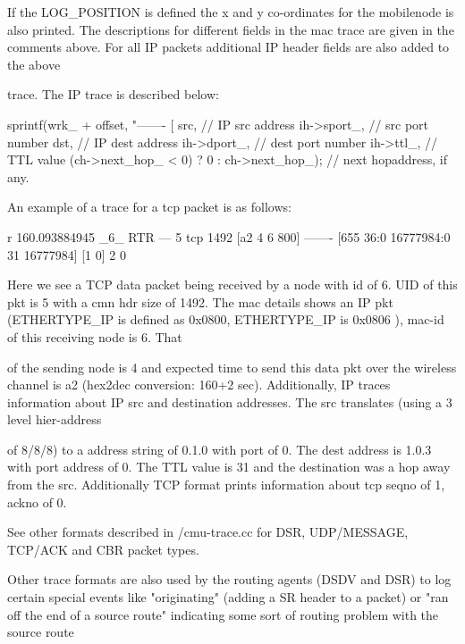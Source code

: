 If the LOG\_POSITION is defined the x and y co-ordinates for the mobilenode is also printed. The descriptions for different fields in the mac trace are given in the comments above. For all IP packets additional IP header fields are also added to the above









 trace. The IP trace is described below:
\begin{program}
sprintf(wrk_ + offset, "------- [%
		src,          // IP src address
		ih->sport_,   // src port number
		dst,          // IP dest address
		ih->dport_,   // dest port number
		ih->ttl_,     // TTL value 
		(ch->next_hop_ < 0) ? 0 : ch->next_hop_); // next hopaddress, if any.
\end{program}

An example of a trace for a tcp packet is as follows:
\begin{program}
r 160.093884945 _6_ RTR  --- 5 tcp 1492 [a2 4 6 800] ------- [655
36:0 16777984:0 31 16777984] [1 0] 2 0
\end{program}
Here we see a TCP data packet being received by a node with id of 6. UID of this pkt is 5 with a cmn hdr size of 1492. The mac details shows an IP pkt (ETHERTYPE\_IP is defined as 0x0800, ETHERTYPE\_IP is 0x0806 ), mac-id of this receiving node is 6. That









 of the sending node is 4 and expected time to send this data pkt over the wireless channel is a2 (hex2dec conversion: 160+2 sec). Additionally, IP traces information about IP src and destination addresses. The src translates (using a 3 level hier-address









 of 8/8/8) to a address string of 0.1.0 with port of 0. The dest address is 1.0.3 with port address of 0. The TTL value is 31 and the destination was a hop away from the src. Additionally TCP format prints information about tcp seqno of 1, ackno of 0. 

See other formats described in \nsf/cmu-trace.cc for DSR, UDP/MESSAGE, TCP/ACK and CBR packet types.

Other trace formats are also used by the routing agents (DSDV and DSR) to log certain special events like "originating" (adding a SR header to a packet) or  "ran off the end of a source route" indicating some sort of routing problem with the source route 









